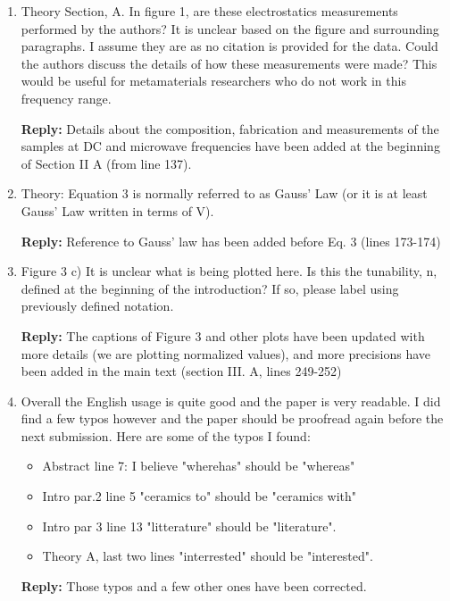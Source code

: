 \documentclass[%
 aip,
 amsmath,amssymb,
 reprint,%
]{revtex4-1}
\newcommand{\rep}[1]{\textcolor{reply}{{\bfseries Reply:} #1}}
\begin{document}
\begin{enumerate}
\item Theory Section, A. In figure 1, are these electrostatics measurements performed by the authors? It is
 unclear based on the figure and surrounding paragraphs. I assume they are as no citation is provided for
  the data. Could the authors discuss the details of how these measurements were made? This would be useful
   for metamaterials researchers who do not work in this frequency range.

\rep{Details about the composition, fabrication and measurements of the samples at DC and microwave frequencies have been added at the beginning of Section II A (from line 137).}


\item Theory: Equation 3 is normally referred to as Gauss' Law (or it is at least Gauss' Law written in
 terms of V).

 \rep{Reference to Gauss' law has been added before Eq. 3 (lines 173-174)}

\item Figure 3 c) It is unclear what is being plotted here. Is this the tunability, n, defined at the
 beginning of the introduction? If so, please label using previously defined notation.


 \rep{The captions of Figure 3 and other plots have been updated with more details (we are plotting normalized values),
 and more precisions have been added in the main text (section III. A, lines 249-252)}




\item Overall the English usage is quite good and the paper is very readable. I did find a few typos
 however and the paper should be proofread again before the next submission. Here are some of the typos I
  found:
\begin{itemize}
  \item Abstract line 7: I believe "wherehas" should be "whereas"

  \item Intro par.2 line 5 "ceramics to" should be "ceramics with"

  \item Intro par 3 line 13 "litterature" should be "literature".

  \item Theory A, last two lines "interrested" should be "interested".
\end{itemize}
\rep{Those typos and a few other ones have been corrected.}

\end{enumerate}
\end{document}
